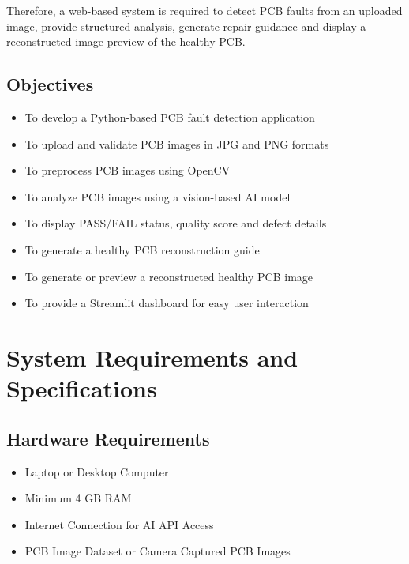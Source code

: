 \documentclass[12pt,a4paper]{report}
\begin{document}
Therefore, a web-based system is required to detect PCB faults from an uploaded image, provide structured analysis, generate repair guidance and display a reconstructed image preview of the healthy PCB.

\section{Objectives}

\begin{itemize}

\item To develop a Python-based PCB fault detection application

\item To upload and validate PCB images in JPG and PNG formats

\item To preprocess PCB images using OpenCV

\item To analyze PCB images using a vision-based AI model

\item To display PASS/FAIL status, quality score and defect details

\item To generate a healthy PCB reconstruction guide

\item To generate or preview a reconstructed healthy PCB image

\item To provide a Streamlit dashboard for easy user interaction

\end{itemize}


\chapter{System Requirements and Specifications}

\section{Hardware Requirements}

\begin{itemize}

\item Laptop or Desktop Computer
\item Minimum 4 GB RAM
\item Internet Connection for AI API Access
\item PCB Image Dataset or Camera Captured PCB Images

\end{itemize}
\end{document}
